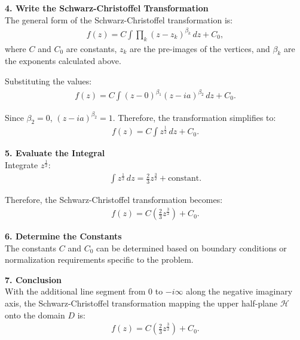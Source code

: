 \begin{example}
    \textbf{4. Write the Schwarz-Christoffel Transformation} \\

    The general form of the Schwarz-Christoffel transformation is:
    \begin{align*}
        f(z) = C \int \prod_{k} (z - z_k)^{\beta_k} \, dz + C_0,
    \end{align*}
    where $C$ and $C_0$ are constants, $z_k$ are the pre-images of the vertices, and $\beta_k$ are the exponents calculated above.

    Substituting the values:
    \begin{align*}
        f(z) = C \int (z - 0)^{\beta_1} (z - i a)^{\beta_2} \, dz + C_0.
    \end{align*}

    Since $\beta_2 = 0$, $(z - i a)^{\beta_2} = 1$. Therefore, the transformation simplifies to:
    \begin{align*}
        f(z) = C \int z^{\frac{1}{2}} \, dz + C_0.
    \end{align*}

    \textbf{5. Evaluate the Integral} \\

    Integrate $z^{\frac{1}{2}}$:
    \begin{align*}
        \int z^{\frac{1}{2}} \, dz = \frac{2}{3} z^{\frac{3}{2}} + \text{constant}.
    \end{align*}

    Therefore, the Schwarz-Christoffel transformation becomes:
    \begin{align*}
        f(z) = C \left( \frac{2}{3} z^{\frac{3}{2}} \right) + C_0.
    \end{align*}

    \textbf{6. Determine the Constants} \\

    The constants $C$ and $C_0$ can be determined based on boundary conditions or normalization requirements specific to the problem.

    \textbf{7. Conclusion} \\

    With the additional line segment from $0$ to $-i \infty$ along the negative imaginary axis, the Schwarz-Christoffel transformation mapping the upper half-plane $\mathcal{H}$ onto the domain $D$ is:
    \begin{align*}
        f(z) = C \left( \frac{2}{3} z^{\frac{3}{2}} \right) + C_0.
    \end{align*}
\end{example}

